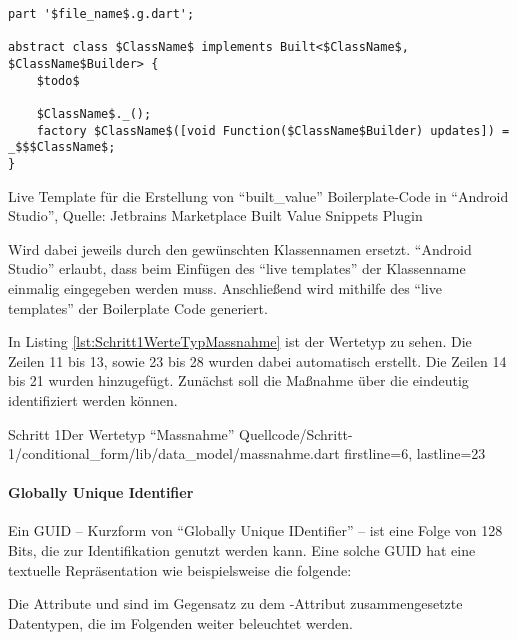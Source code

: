 \ifIncludeFigures
  \begin{listing}[h]
    \begin{verbatim}
part '$file_name$.g.dart';

abstract class $ClassName$ implements Built<$ClassName$, $ClassName$Builder> {
    $todo$
    
    $ClassName$._();
    factory $ClassName$([void Function($ClassName$Builder) updates]) = _$$$ClassName$;
}

\end{verbatim}
    \caption[\enquote{built_value} Live Template]{Live Template für die Erstellung von \enquote{built_value} Boilerplate-Code in \enquote{Android Studio}, Quelle: Jetbrains Marketplace Built Value Snippets Plugin}
    \label{lst:BuiltValueLiveTemplate}
  \end{listing}
\fi

 Wird dabei jeweils durch den gewünschten Klassennamen ersetzt.
\enquote{Android Studio} erlaubt, dass beim Einfügen des \enquote{live templates} der Klassenname einmalig eingegeben werden muss.  Anschließend wird mithilfe des \enquote{live templates} der Boilerplate Code generiert.

In Listing \ref{lst:Schritt1WerteTypMassnahme} ist der Wertetyp  zu sehen.
Die Zeilen 11 bis 13, sowie 23 bis 28 wurden dabei automatisch erstellt.
Die Zeilen 14 bis 21 wurden hinzugefügt.
Zunächst soll die Maßnahme über die  eindeutig identifiziert werden können.

\begin{alexlisting}{Schritt 1}{Der Wertetyp \enquote{Massnahme}}
  {Quellcode/Schritt-1/conditional_form/lib/data_model/massnahme.dart}
  {firstline=6, lastline=23}
  \label{lst:Schritt1WerteTypMassnahme}
\end{alexlisting}

\paragraph{Globally Unique Identifier}
Ein GUID -- Kurzform von \enquote{Globally Unique IDentifier} -- ist  eine Folge von 128 Bits, die zur Identifikation genutzt werden kann.
Eine solche GUID hat eine textuelle Repräsentation wie beispielsweise die folgende: 


Die Attribute  und  sind im Gegensatz zu dem -Attribut  zusammengesetzte Datentypen, die im Folgenden weiter beleuchtet werden.

